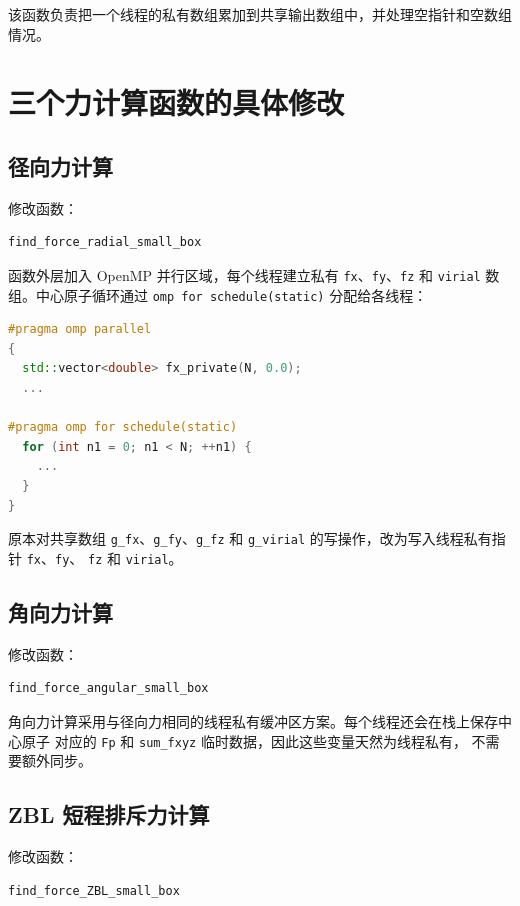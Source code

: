 \documentclass[11pt,a4paper,fontset=fandol]{ctexart}
\begin{document}
该函数负责把一个线程的私有数组累加到共享输出数组中，并处理空指针和空数组情况。

\section{三个力计算函数的具体修改}

\subsection{径向力计算}

修改函数：
\begin{lstlisting}
find_force_radial_small_box
\end{lstlisting}

函数外层加入 OpenMP 并行区域，每个线程建立私有
\texttt{fx}、\texttt{fy}、\texttt{fz} 和 \texttt{virial} 数组。中心原子循环通过
\texttt{omp for schedule(static)} 分配给各线程：

\begin{lstlisting}[language=C++]
#pragma omp parallel
{
  std::vector<double> fx_private(N, 0.0);
  ...

#pragma omp for schedule(static)
  for (int n1 = 0; n1 < N; ++n1) {
    ...
  }
}
\end{lstlisting}

原本对共享数组 \texttt{g\_fx}、\texttt{g\_fy}、\texttt{g\_fz} 和
\texttt{g\_virial} 的写操作，改为写入线程私有指针 \texttt{fx}、\texttt{fy}、
\texttt{fz} 和 \texttt{virial}。

\subsection{角向力计算}

修改函数：
\begin{lstlisting}
find_force_angular_small_box
\end{lstlisting}

角向力计算采用与径向力相同的线程私有缓冲区方案。每个线程还会在栈上保存中心原子
对应的 \texttt{Fp} 和 \texttt{sum\_fxyz} 临时数据，因此这些变量天然为线程私有，
不需要额外同步。

\subsection{ZBL 短程排斥力计算}

修改函数：
\begin{lstlisting}
find_force_ZBL_small_box
\end{lstlisting}
\end{document}
